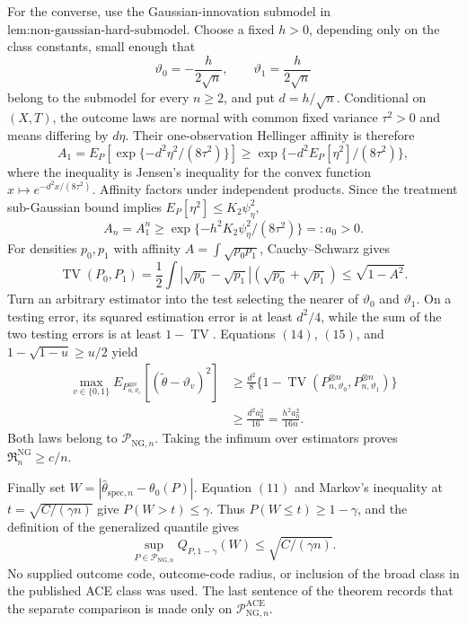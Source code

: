 For the converse, use the Gaussian-innovation submodel in \(\text{lem:non-gaussian-hard-submodel}\).  Choose a fixed \(h>0\), depending only on the class constants, small enough that
\[
 \vartheta_0=-\frac{h}{2\sqrt n},
 \qquad
 \vartheta_1=\frac{h}{2\sqrt n}
\]
belong to the submodel for every \(n\ge2\), and put \(d=h/\sqrt n\).  Conditional on \((X,T)\), the outcome laws are normal with common fixed variance \(\tau^2>0\) and means differing by \(d\eta\).  Their one-observation Hellinger affinity is therefore
\[
 A_1
 =E_P\!\left[\exp\{-d^2\eta^2/(8\tau^2)\}\right]
 \ge\exp\{-d^2E_P[\eta^2]/(8\tau^2)\}, \tag{13}
\]
where the inequality is Jensen's inequality for the convex function \(x\mapsto e^{-d^2x/(8\tau^2)}\).  Affinity factors under independent products.  Since the treatment sub-Gaussian bound implies \(E_P[\eta^2]\le K_2\psi_\eta^2\),
\[
 A_n=A_1^n
 \ge\exp\{-h^2K_2\psi_\eta^2/(8\tau^2)\}
 =:a_0>0. \tag{14}
\]
For densities \(p_0,p_1\) with affinity \(A=\int\sqrt{p_0p_1}\), Cauchy--Schwarz gives
\[
 \operatorname{TV}(P_0,P_1)
 =\frac12\int|\sqrt{p_0}-\sqrt{p_1}|
                  (\sqrt{p_0}+\sqrt{p_1})
 \le\sqrt{1-A^2}. \tag{15}
\]
Turn an arbitrary estimator into the test selecting the nearer of \(\vartheta_0\) and \(\vartheta_1\).  On a testing error, its squared estimation error is at least \(d^2/4\), while the sum of the two testing errors is at least \(1-\operatorname{TV}\).  Equations \((14)\), \((15)\), and \(1-\sqrt{1-u}\ge u/2\) yield
\begin{equation}\tag{16}
\begin{aligned}
 \max_{v\in\{0,1\}}
 E_{P_{n,\vartheta_v}^{\otimes n}}
 [ (\widetilde\theta-\vartheta_v)^2 ]
 &\ge\frac{d^2}{8}
   \{1-\operatorname{TV}(P_{n,\vartheta_0}^{\otimes n},
                          P_{n,\vartheta_1}^{\otimes n})\}\\
 &\ge\frac{d^2a_0^2}{16}
 =\frac{h^2a_0^2}{16n}.
\end{aligned}
\end{equation}
Both laws belong to \(\mathcal P_{\mathrm{NG},n}\).  Taking the infimum over estimators proves \(\mathfrak R_n^{\mathrm{NG}}\ge c/n\).

Finally set \(W=|\widehat\theta_{\mathrm{spec},n}-\theta_0(P)|\).  Equation \((11)\) and Markov's inequality at \(t=\sqrt{C/(\gamma n)}\) give \(P(W>t)\le\gamma\).  Thus \(P(W\le t)\ge1-\gamma\), and the definition of the generalized quantile gives
\[
 \sup_{P\in\mathcal P_{\mathrm{NG},n}}
 Q_{P,1-\gamma}(W)
 \le\sqrt{C/(\gamma n)}.
\]
No supplied outcome code, outcome-code radius, or inclusion of the broad class in the published ACE class was used.  The last sentence of the theorem records that the separate comparison is made only on \(\mathcal P_{\mathrm{NG},n}^{\mathrm{ACE}}\).